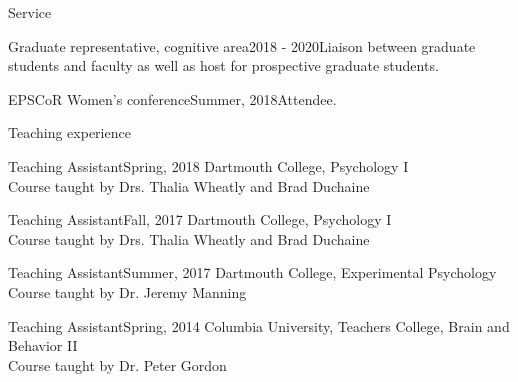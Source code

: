 \documentclass{resume} %
\begin{document}
\begin{rSection}{Service}


\begin{rSubsection}{Graduate representative, cognitive area}{2018 - 2020}{Liaison between graduate students and faculty as well as host for prospective graduate students.}{}
\end{rSubsection}


\begin{rSubsection}{EPSCoR Women’s conference}{Summer, 2018}{Attendee.}{}
\end{rSubsection}

\end{rSection}




\begin{rSection}{Teaching experience}


\begin{rSubsection}{Teaching Assistant}{Spring, 2018}
{Dartmouth College, Psychology I  
 \\ Course taught by Drs. Thalia Wheatly and Brad Duchaine}{}
\end{rSubsection}


\begin{rSubsection}{Teaching Assistant}{Fall, 2017}
{Dartmouth College, Psychology I  
 \\ Course taught by Drs. Thalia Wheatly and Brad Duchaine}{}
\end{rSubsection}


\begin{rSubsection}{Teaching Assistant}{Summer, 2017}
{Dartmouth College, Experimental Psychology 
\\ Course taught by Dr. Jeremy Manning}{}
\end{rSubsection}


\begin{rSubsection}{Teaching Assistant}{Spring, 2014}
{Columbia University, Teachers College, Brain and Behavior II
\\ Course taught by Dr. Peter Gordon}{}
\end{rSubsection}

\end{rSection}
\end{document}
